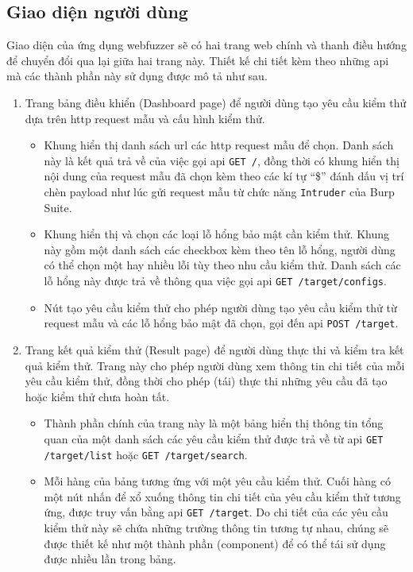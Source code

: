 \subsection{Giao diện người dùng}
Giao diện của ứng dụng webfuzzer sẽ có hai trang web chính và thanh điều hướng để chuyển đổi qua lại giữa hai trang này. Thiết kế chi tiết kèm theo những \acrshort{api} mà các thành phần này sử dụng được mô tả như sau.
\begin{enumerate}
    \item Trang bảng điều khiển (Dashboard page) để người dùng tạo yêu cầu kiểm thử dựa trên \acrshort{http} request mẫu và cấu hình kiểm thử.
    \begin{itemize}
        \item Khung hiển thị danh sách \acrshort{url} các \acrshort{http} request mẫu để chọn. Danh sách này là kết quả trả về của việc gọi \acrshort{api} \texttt{GET /}, đồng thời có khung hiển thị nội dung của request mẫu đã chọn kèm theo các kí tự ``\$'' đánh dấu vị trí chèn payload như lúc gửi request mẫu từ chức năng \texttt{Intruder} của Burp Suite.
        \item Khung hiển thị và chọn các loại lỗ hổng bảo mật cần kiểm thử. Khung này gồm một danh sách các checkbox kèm theo tên lỗ hổng, người dùng có thể chọn một hay nhiều lỗi tùy theo nhu cầu kiểm thử. Danh sách các lỗ hổng này được trả về thông qua việc gọi \acrshort{api} \texttt{GET /target/configs}.
        \item Nút tạo yêu cầu kiểm thử cho phép người dùng tạo yêu cầu kiểm thử từ request mẫu và các lỗ hổng bảo mật đã chọn, gọi đến \acrshort{api} \texttt{POST /target}.
    \end{itemize}
    \item Trang kết quả kiểm thử (Result page) để người dùng thực thi và kiểm tra kết quả kiểm thử. Trang này cho phép người dùng xem thông tin chi tiết của mỗi yêu cầu kiểm thử, đồng thời cho phép (tái) thực thi những yêu cầu đã tạo hoặc kiểm thử chưa hoàn tất.
    \begin{itemize}
        \item Thành phần chính của trang này là một bảng hiển thị thông tin tổng quan của một danh sách các yêu cầu kiểm thử được trả về từ \acrshort{api} \texttt{GET /target/list} hoặc \texttt{GET /target/search}.
        \item Mỗi hàng của bảng tương ứng với một yêu cầu kiểm thử. Cuối hàng có một nút nhấn để xổ xuống thông tin chi tiết của yêu cầu kiểm thử tương ứng, được truy vấn bằng \acrshort{api} \texttt{GET /target}. Do chi tiết của các yêu cầu kiểm thử này sẽ chứa những trường thông tin tương tự nhau, chúng sẽ được thiết kế như một thành phần (component) để có thể tái sử dụng được nhiều lần trong bảng.

\end{itemize}
\end{enumerate}
